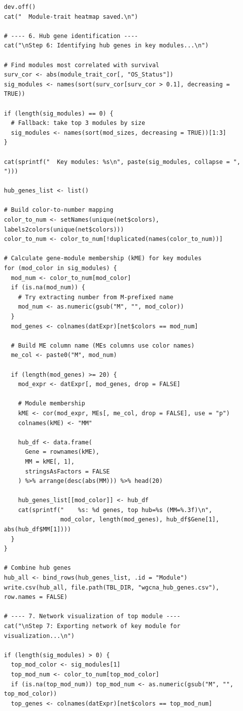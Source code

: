 \documentclass[12pt,a4paper]{ctexart}
\begin{document}
\begin{lstlisting}[caption={08_wgcna}, basicstyle=\ttfamily\scriptsize]
dev.off()
cat("  Module-trait heatmap saved.\n")

# ---- 6. Hub gene identification ----
cat("\nStep 6: Identifying hub genes in key modules...\n")

# Find modules most correlated with survival
surv_cor <- abs(module_trait_cor[, "OS_Status"])
sig_modules <- names(sort(surv_cor[surv_cor > 0.1], decreasing = TRUE))

if (length(sig_modules) == 0) {
  # Fallback: take top 3 modules by size
  sig_modules <- names(sort(mod_sizes, decreasing = TRUE))[1:3]
}

cat(sprintf("  Key modules: %s\n", paste(sig_modules, collapse = ", ")))

hub_genes_list <- list()

# Build color-to-number mapping
color_to_num <- setNames(unique(net$colors), labels2colors(unique(net$colors)))
color_to_num <- color_to_num[!duplicated(names(color_to_num))]

# Calculate gene-module membership (kME) for key modules
for (mod_color in sig_modules) {
  mod_num <- color_to_num[mod_color]
  if (is.na(mod_num)) {
    # Try extracting number from M-prefixed name
    mod_num <- as.numeric(gsub("M", "", mod_color))
  }
  mod_genes <- colnames(datExpr)[net$colors == mod_num]

  # Build ME column name (MEs columns use color names)
  me_col <- paste0("M", mod_num)

  if (length(mod_genes) >= 20) {
    mod_expr <- datExpr[, mod_genes, drop = FALSE]

    # Module membership
    kME <- cor(mod_expr, MEs[, me_col, drop = FALSE], use = "p")
    colnames(kME) <- "MM"

    hub_df <- data.frame(
      Gene = rownames(kME),
      MM = kME[, 1],
      stringsAsFactors = FALSE
    ) %>% arrange(desc(abs(MM))) %>% head(20)

    hub_genes_list[[mod_color]] <- hub_df
    cat(sprintf("    %s: %d genes, top hub=%s (MM=%.3f)\n",
                mod_color, length(mod_genes), hub_df$Gene[1], abs(hub_df$MM[1])))
  }
}

# Combine hub genes
hub_all <- bind_rows(hub_genes_list, .id = "Module")
write.csv(hub_all, file.path(TBL_DIR, "wgcna_hub_genes.csv"), row.names = FALSE)

# ---- 7. Network visualization of top module ----
cat("\nStep 7: Exporting network of key module for visualization...\n")

if (length(sig_modules) > 0) {
  top_mod_color <- sig_modules[1]
  top_mod_num <- color_to_num[top_mod_color]
  if (is.na(top_mod_num)) top_mod_num <- as.numeric(gsub("M", "", top_mod_color))
  top_genes <- colnames(datExpr)[net$colors == top_mod_num]


\end{lstlisting}
\end{document}
